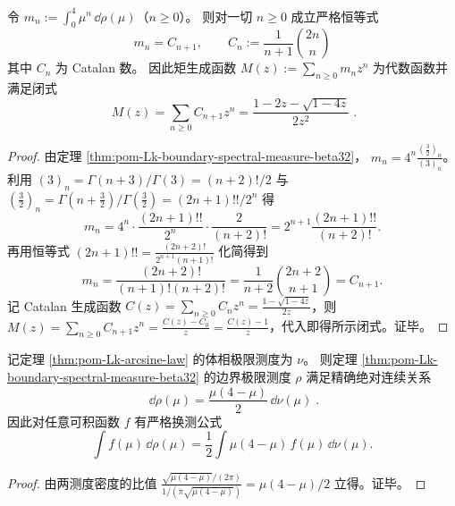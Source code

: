\begin{corollary}\label{cor:pom-Lk-boundary-catalan-moments-gf}
令
\(
m_n:=\int_{0}^{4}\mu^{n}\,\dd\rho(\mu)
\)（\(n\ge 0\)）。
则对一切 \(n\ge 0\) 成立严格恒等式
\[
\boxed{\;
m_n=C_{n+1},\qquad
C_n:=\frac{1}{n+1}\binom{2n}{n}\;}
\]
其中 \(C_n\) 为 Catalan 数。
因此矩生成函数
\(
M(z):=\sum_{n\ge 0}m_n z^n
\)
为代数函数并满足闭式
\[
\boxed{\;
M(z)=\sum_{n\ge 0}C_{n+1}z^n
=\frac{1-2z-\sqrt{1-4z}}{2z^2}\; }.
\]
\end{corollary}

\begin{proof}
由定理 \ref{thm:pom-Lk-boundary-spectral-measure-beta32}，
\(
m_n=4^{n}\frac{(\tfrac32)_n}{(3)_n}
\)。
利用 \((3)_n=\Gamma(n+3)/\Gamma(3)=(n+2)!/2\) 与 \((\tfrac32)_n=\Gamma(n+\tfrac32)/\Gamma(\tfrac32)=(2n+1)!!/2^{n}\) 得
\[
m_n=4^{n}\cdot\frac{(2n+1)!!}{2^{n}}\cdot\frac{2}{(n+2)!}
=2^{n+1}\frac{(2n+1)!!}{(n+2)!}.
\]
再用恒等式 \((2n+1)!!=\frac{(2n+2)!}{2^{n+1}(n+1)!}\) 化简得到
\[
m_n=\frac{(2n+2)!}{(n+1)!(n+2)!}
=\frac{1}{n+2}\binom{2n+2}{n+1}
=C_{n+1}.
\]
记 Catalan 生成函数 \(C(z)=\sum_{n\ge 0}C_n z^n=\frac{1-\sqrt{1-4z}}{2z}\)，则
\(
M(z)=\sum_{n\ge 0}C_{n+1}z^n=\frac{C(z)-C_0}{z}=\frac{C(z)-1}{z}
\)，代入即得所示闭式。证毕。
\end{proof}

\begin{corollary}\label{cor:pom-Lk-boundary-bulk-radon-nikodym}
记定理 \ref{thm:pom-Lk-arcsine-law} 的体相极限测度为 \(\nu\)。
则定理 \ref{thm:pom-Lk-boundary-spectral-measure-beta32} 的边界极限测度 \(\rho\) 满足精确绝对连续关系
\[
\boxed{\;
\dd\rho(\mu)=\frac{\mu(4-\mu)}{2}\,\dd\nu(\mu)\; }.
\]
因此对任意可积函数 \(f\) 有严格换测公式
\[
\int f(\mu)\,\dd\rho(\mu)=\frac12\int \mu(4-\mu)\,f(\mu)\,\dd\nu(\mu).
\]
\end{corollary}

\begin{proof}
由两测度密度的比值
\(
\frac{\sqrt{\mu(4-\mu)}/(2\pi)}{1/(\pi\sqrt{\mu(4-\mu)})}=\mu(4-\mu)/2
\)
立得。证毕。
\end{proof}


